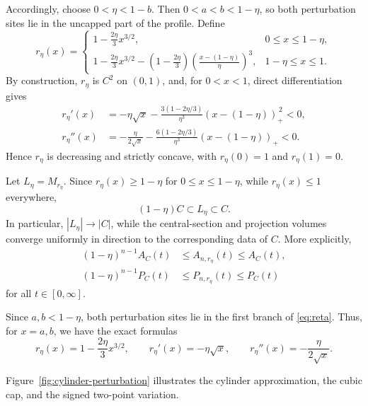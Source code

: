 \documentclass[11pt]{article}
\theoremstyle{remark}
\newcommand{\pos}[1]{(#1)_{+}}
\begin{document}
Accordingly, choose $0<\eta<1-b$.  Then
$0<a<b<1-\eta$, so both perturbation sites lie in the uncapped part of the
profile.  Define
\begin{equation}\label{eq:reta}
 r_\eta(x)=
 \begin{cases}
 \displaystyle
 1-\frac{2\eta}{3}x^{3/2},
 &0\leq x\leq1-\eta,\\[3mm]
 \displaystyle
 1-\frac{2\eta}{3}x^{3/2}
 -\left(1-\frac{2\eta}{3}\right)
  \left(\frac{x-(1-\eta)}{\eta}\right)^3,
 &1-\eta\leq x\leq1.
 \end{cases}
\end{equation}
By construction, $r_\eta$ is $C^2$ on $(0,1)$, and, for $0<x<1$, direct
differentiation gives
\begin{align}
 r_\eta'(x)
 &=-\eta\sqrt{x}
 -\frac{3(1-2\eta/3)}{\eta^3}\pos{x-(1-\eta)}^{\,2}<0,
 \label{eq:reta-prime}\\
 r_\eta''(x)
 &=-\frac{\eta}{2\sqrt{x}}
 -\frac{6(1-2\eta/3)}{\eta^3}\pos{x-(1-\eta)}<0.
 \label{eq:reta-second}
\end{align}
Hence $r_\eta$ is decreasing and strictly concave, with
$r_\eta(0)=1$ and $r_\eta(1)=0$.

Let $L_\eta=M_{r_\eta}$.  Since $r_\eta(x)\geq1-\eta$ for
$0\leq x\leq1-\eta$, while $r_\eta(x)\leq1$ everywhere,
\begin{equation}\label{eq:cylinder-inclusion}
 (1-\eta)C\subset L_\eta\subset C.
\end{equation}
In particular, $|L_\eta|\to|C|$, while the central-section and projection
volumes converge uniformly in direction to the corresponding data of $C$.
More explicitly,
\begin{align*}
 (1-\eta)^{n-1}A_C(t)&\leq A_{n,r_\eta}(t)\leq A_C(t),\\
 (1-\eta)^{n-1}P_C(t)&\leq P_{n,r_\eta}(t)\leq P_C(t)
\end{align*}
for all $t\in[0,\infty]$.

Since $a,b<1-\eta$, both perturbation sites lie in the first branch of
\eqref{eq:reta}.  Thus, for $x=a,b$, we have the exact formulas
\begin{equation}\label{eq:local-exact}
 r_\eta(x)=1-\frac{2\eta}{3}x^{3/2},\qquad
 r_\eta'(x)=-\eta\sqrt{x},\qquad
 r_\eta''(x)=-\frac{\eta}{2\sqrt{x}}.
\end{equation}

Figure~\ref{fig:cylinder-perturbation} illustrates the cylinder
approximation, the cubic cap, and the signed two-point variation.
\end{document}
